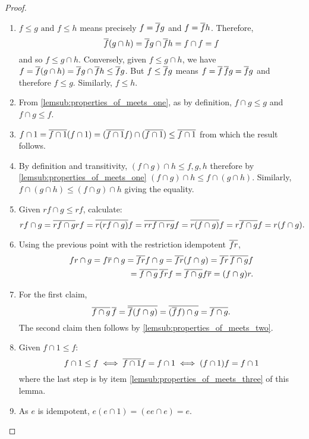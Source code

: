 \begin{proof}
  \prepprooflist
  \begin{enumerate}[{(}i{)}]
    \item $f\le g \text{ and } f \le h$ means precisely $f = \overline{f} g$ and $f = \overline{f} h$.
      Therefore,
      \[
        \overline{f} (g\cap h) =  \overline{f} g \cap \overline{f} h =  f\cap f = f
      \]
      and so $f \le g \cap h$. Conversely, given $f \le g\cap h$, we have 
      $f = \overline{f} (g\cap h) = \overline{f} g \cap \overline{f} h \le \overline{f} g $. But 
      $f \le \overline{f} g$ means $f = \overline{f}\,\overline{f} g = \overline{f}g$ and therefore 
      $f \le g$. Similarly, $f \le h$.
    \item From \vref{lemsub:properties_of_meets_one}, as by definition, $f\cap g \le g$ and 
      $f \cap g \le f$.
    \item $f\cap 1 = \overline{f\cap 1} (f \cap 1)= (\overline{f \cap 1} f ) \cap (\overline{f \cap 1})
      \le \overline{f \cap 1}$ from which the result follows. %
    \item By definition and transitivity, $(f\cap g)\cap h \le f, g, h$ therefore by 
      \vref{lemsub:properties_of_meets_one} $(f \cap g) \cap h \le f \cap (g \cap h)$. Similarly, 
      $f \cap (g \cap h) \le(f \cap g) \cap h$ giving the equality.
    \item Given  $r f \cap g \le r f$, calculate:
      \[
        r f\cap g
        = \overline{r f\cap g} r f
        = \overline{r (r f\cap g)} f
        = \overline{r r f\cap r g} f
        = \overline{r (f\cap g)} f
        = r \overline{f\cap g} f
        = r (f\cap g).
      \]
    \item Using the previous point with the restriction idempotent $\overline{f r}$,
      \begin{equation*}
        \begin{split}
          f r \cap g
          = f \restr{r} \cap g   %
          = \restr{f r }f \cap g  %
          = \restr{f r}(f\cap g)   %
          = \restr{f r}\, \restr{f\cap g} f \\ %
          = \restr{f\cap g}\, \restr{f r} f %
          = \restr{f\cap g} f \restr{r}  %
          = (f\cap g) r. %
        \end{split}
      \end{equation*}
    \item For the first claim,
      \[
        \overline{f\cap g}\, \overline{f} =\overline{\overline{f}(f\cap g)}\\
        =\overline{(\overline{f}f)\cap g} =\overline{f\cap g}.
      \]
      The second claim then follows by \vref{lemsub:properties_of_meets_two}.
    \item Given $ f \cap 1 \leq f$:
      \[ 
        f \cap 1 \leq f \iff  \overline{f \cap 1} f = f \cap 1 \iff  (f \cap 1) f = f \cap 1
      \]
      where the last step is by item \vref{lemsub:properties_of_meets_three} of this lemma.
    \item As $e$ is idempotent, $e (e\cap 1) = (e e \cap e) = e$.
  \end{enumerate}
\end{proof}
